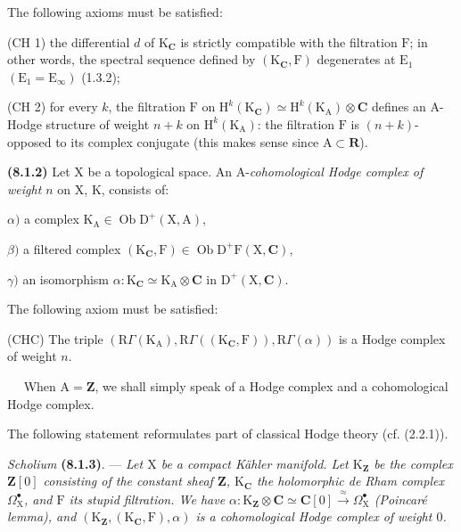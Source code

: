 \documentclass[11pt,leqno]{article}
\newcommand{\Page}[1]{\ifvmode\noindent\else\unskip\ \fi{\footnotesize\textcolor{gray}{[p.\,#1]}}\ \ignorespaces}
\begin{document}
The following axioms must be satisfied:

\noindent
(CH 1) the differential \(d\) of \(\mathrm{K}_{\mathbf{C}}\) is strictly compatible with the filtration \(\mathrm{F}\); in other words, the spectral sequence defined by \((\mathrm{K}_{\mathbf{C}},\mathrm{F})\) degenerates at \(\mathrm{E}_1\) \((\mathrm{E}_1=\mathrm{E}_{\infty})\) (1.3.2);

\noindent
(CH 2) for every \(k\), the filtration \(\mathrm{F}\) on \(\mathrm{H}^{k}(\mathrm{K}_{\mathbf{C}})\simeq\mathrm{H}^{k}(\mathrm{K}_{\mathrm{A}})\otimes\mathbf{C}\) defines an \(\mathrm{A}\)-Hodge structure of weight \(n+k\) on \(\mathrm{H}^{k}(\mathrm{K}_{\mathrm{A}})\): the filtration \(\mathrm{F}\) is \((n+k)\)-opposed to its complex conjugate (this makes sense since \(\mathrm{A}\subset\mathbf{R}\)).

\textbf{(8.1.2)} Let \(\mathrm{X}\) be a topological space. An \(\mathrm{A}\)-\textit{cohomological Hodge complex of weight \(n\)} on \(\mathrm{X}\), \(\mathrm{K}\), consists of:

\noindent
\(\alpha)\) a complex \(\mathrm{K}_{\mathrm{A}}\in\operatorname{Ob}\mathrm{D}^{+}(\mathrm{X},\mathrm{A})\),

\noindent
\(\beta)\) a filtered complex \((\mathrm{K}_{\mathbf{C}},\mathrm{F})\in\operatorname{Ob}\mathrm{D}^{+}\mathrm{F}(\mathrm{X},\mathbf{C})\),

\noindent
\(\gamma)\) an isomorphism \(\alpha:\mathrm{K}_{\mathbf{C}}\simeq\mathrm{K}_{\mathrm{A}}\otimes\mathbf{C}\) in \(\mathrm{D}^{+}(\mathrm{X},\mathbf{C})\).

The following axiom must be satisfied:

\noindent
(CHC) The triple \((\mathrm{R}\Gamma(\mathrm{K}_{\mathrm{A}}),\mathrm{R}\Gamma((\mathrm{K}_{\mathbf{C}},\mathrm{F})),\mathrm{R}\Gamma(\alpha))\) is a Hodge complex of weight \(n\).

\Page{29}
When \(\mathrm{A}=\mathbf{Z}\), we shall simply speak of a Hodge complex and a cohomological Hodge complex.

The following statement reformulates part of classical Hodge theory (cf. (2.2.1)).

\textit{Scholium} \textbf{(8.1.3)}. — \textit{Let \(\mathrm{X}\) be a compact Kähler manifold. Let \(\mathrm{K}_{\mathbf{Z}}\) be the complex \(\mathbf{Z}[0]\) consisting of the constant sheaf \(\mathbf{Z}\), \(\mathrm{K}_{\mathbf{C}}\) the holomorphic de Rham complex \(\Omega_{\mathrm{X}}^\bullet\), and \(\mathrm{F}\) its stupid filtration. We have \(\alpha:\mathrm{K}_{\mathbf{Z}}\otimes\mathbf{C}\simeq\mathbf{C}[0]\xrightarrow{\approx}\Omega_{\mathrm{X}}^\bullet\) (Poincaré lemma), and \((\mathrm{K}_{\mathbf{Z}},(\mathrm{K}_{\mathbf{C}},\mathrm{F}),\alpha)\) is a cohomological Hodge complex of weight \(0\).}
\end{document}
